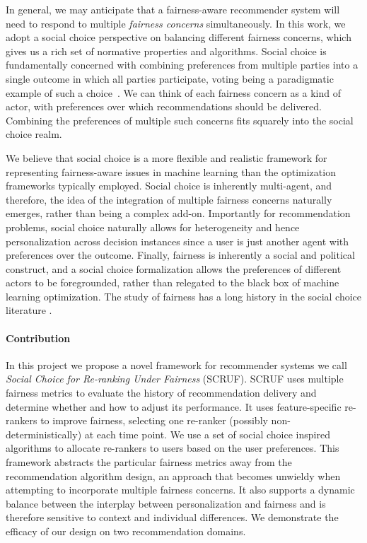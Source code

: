 In general, we may anticipate that a fairness-aware recommender system will need to respond to multiple \textit{fairness concerns} simultaneously. In this work, we adopt a social choice perspective \cite{BCELP16a} on balancing different fairness concerns, which gives us a rich set of normative properties and algorithms. Social choice is fundamentally concerned with combining preferences from multiple parties into a single outcome in which all parties participate, voting being a paradigmatic example of such a choice~\cite{Zwicker:Voting}. We can think of each fairness concern as a kind of actor, with preferences over which recommendations should be delivered. Combining the preferences of multiple such concerns fits squarely into the social choice realm.

We believe that social choice is a more flexible and realistic framework for representing fairness-aware issues in machine learning than the optimization frameworks typically employed. Social choice is inherently multi-agent, and therefore, the idea of the integration of multiple fairness concerns naturally emerges, rather than being a complex add-on. Importantly for recommendation problems, social choice naturally allows for heterogeneity and hence personalization across decision instances since a user is just another agent with preferences over the outcome. Finally, fairness is inherently a social and political construct, and a social choice formalization allows the preferences of different actors to be foregrounded, rather than relegated to the black box of machine learning optimization. The study of fairness has a long history in the social choice literature \cite{Young:Equity,Zwicker:Voting}.

\paragraph{Contribution}

In this project we propose a novel framework for recommender systems we call \textit{Social Choice for Re-ranking Under Fairness} (SCRUF). SCRUF uses multiple fairness metrics to evaluate the history of recommendation delivery and determine whether and how to adjust its performance. It uses feature-specific re-rankers to improve fairness, selecting one re-ranker (possibly non-deterministically) at each time point. We use a set of social choice inspired algorithms to allocate re-rankers to users based on the user preferences. This framework abstracts the particular fairness metrics away from the recommendation algorithm design, an approach that becomes unwieldy when attempting to incorporate multiple fairness concerns. It also supports a dynamic balance between the interplay between personalization and fairness and is therefore sensitive to context and individual differences. We demonstrate the efficacy of our design on two recommendation domains.

